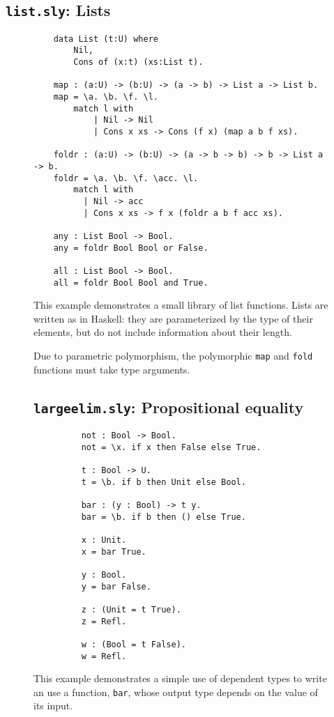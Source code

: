 \subsection{\texttt{list.sly}: Lists}
\begin{figure}[h!]
\begin{lstlisting}
    data List (t:U) where
        Nil,
        Cons of (x:t) (xs:List t).

    map : (a:U) -> (b:U) -> (a -> b) -> List a -> List b.
    map = \a. \b. \f. \l.
        match l with
            | Nil -> Nil
            | Cons x xs -> Cons (f x) (map a b f xs).

    foldr : (a:U) -> (b:U) -> (a -> b -> b) -> b -> List a -> b.
    foldr = \a. \b. \f. \acc. \l.
        match l with
          | Nil -> acc
          | Cons x xs -> f x (foldr a b f acc xs).

    any : List Bool -> Bool.
    any = foldr Bool Bool or False.

    all : List Bool -> Bool.
    all = foldr Bool Bool and True.
\end{lstlisting}
This example demonstrates a small library of list functions. Lists are written
as in Haskell: they are parameterized by the type of their elements, but do not
include information about their length.

Due to parametric polymorphism, the polymorphic \texttt{map} and \texttt{fold}
functions must take type arguments.

\subsection{\texttt{largeelim.sly}: Propositional equality}
\begin{figure}[h!]
\begin{lstlisting}
    not : Bool -> Bool.
    not = \x. if x then False else True.
    
    t : Bool -> U.
    t = \b. if b then Unit else Bool.
    
    bar : (y : Bool) -> t y.
    bar = \b. if b then () else True.    

    x : Unit.
    x = bar True.

    y : Bool.
    y = bar False.

    z : (Unit = t True).
    z = Refl.

    w : (Bool = t False).
    w = Refl.
\end{lstlisting}
\end{figure}
This example demonstrates a simple use of dependent types to write an use a
function, \texttt{bar}, whose output type depends on the value of its input.


\end{figure}
